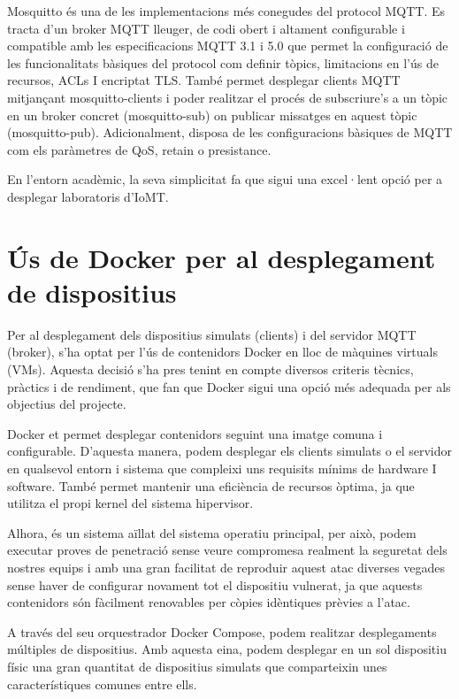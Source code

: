   \label{sec:mosquitto}
  Mosquitto és una de les implementacions més conegudes del protocol MQTT. Es tracta d’un broker MQTT lleuger, de codi obert i altament configurable i compatible amb les especificacions MQTT 3.1 i 5.0 que permet la configuració de les funcionalitats bàsiques del protocol com definir tòpics, limitacions en l'ús de recursos, ACLs I encriptat TLS. També permet desplegar clients MQTT mitjançant mosquitto-clients i poder realitzar el procés de subscriure’s a un tòpic en un broker concret (mosquitto-sub) on publicar missatges en aquest tòpic (mosquitto-pub). Adicionalment, disposa de les configuracions bàsiques de MQTT com els paràmetres de QoS, retain o presistance. \cite{Mosquittoexp}

  En l’entorn acadèmic, la seva simplicitat fa que sigui una excel·lent opció per a desplegar laboratoris d’IoMT.


\section{Ús de Docker per al desplegament de dispositius}

  Per al desplegament dels dispositius simulats (clients) i del servidor MQTT (broker), s’ha optat per l’ús de contenidors Docker en lloc de màquines virtuals (VMs). Aquesta decisió s’ha pres tenint en compte diversos criteris tècnics, pràctics i de rendiment, que fan que Docker sigui una opció més adequada per als objectius del projecte.

  Docker et permet desplegar contenidors seguint una imatge comuna i configurable. D’aquesta manera, podem desplegar els clients simulats o el servidor en qualsevol entorn i sistema que compleixi uns requisits mínims de hardware I software. També permet mantenir una eficiència de recursos òptima, ja que utilitza el propi kernel del sistema hipervisor.

  Alhora, és un sistema aïllat del sistema operatiu principal, per això, podem executar proves de penetració sense veure compromesa realment la seguretat dels nostres equips i amb una gran facilitat de reproduir aquest atac diverses vegades sense haver de configurar novament tot el dispositiu vulnerat, ja que aquests contenidors són fàcilment renovables per còpies idèntiques prèvies a l'atac.
  
  A través del seu orquestrador Docker Compose, podem realitzar desplegaments múltiples de dispositius. Amb aquesta eina, podem desplegar en un sol dispositiu físic una gran quantitat de dispositius simulats que comparteixin unes característiques comunes entre ells.

